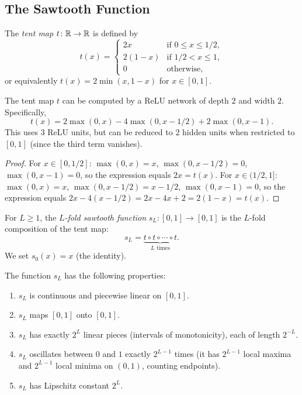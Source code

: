\documentclass[11pt,a4paper]{article}
\begin{document}
\subsection{The Sawtooth Function}
\label{sec:sawtooth}

\begin{definition}
\label{def:tent-map}
The \emph{tent map} $t \colon \mathbb{R} \to \mathbb{R}$ is defined by
\[
  t(x) = \begin{cases}
    2x & \text{if } 0 \le x \le 1/2, \\
    2(1-x) & \text{if } 1/2 < x \le 1, \\
    0 & \text{otherwise},
  \end{cases}
\]
or equivalently $t(x) = 2 \min(x, 1-x)$ for $x \in [0,1]$.
\end{definition}

\begin{lemma}
\label{lem:tent-relu}
The tent map $t$ can be computed by a ReLU network of depth $2$ and
width $2$.  Specifically,
\[
  t(x) = 2\max(0, x) - 4\max(0, x - 1/2) + 2\max(0, x - 1).
\]
This uses $3$ ReLU units, but can be reduced to $2$ hidden units when
restricted to $[0,1]$ (since the third term vanishes).
\end{lemma}

\begin{proof}
For $x \in [0, 1/2]$: $\max(0, x) = x$, $\max(0, x - 1/2) = 0$,
$\max(0, x - 1) = 0$, so the expression equals $2x = t(x)$.
For $x \in (1/2, 1]$: $\max(0, x) = x$, $\max(0, x - 1/2) = x - 1/2$,
$\max(0, x - 1) = 0$, so the expression equals
$2x - 4(x - 1/2) = 2x - 4x + 2 = 2(1-x) = t(x)$.
\end{proof}

\begin{definition}
\label{def:sawtooth}
For $L \ge 1$, the \emph{$L$-fold sawtooth function}
$s_L \colon [0,1] \to [0,1]$ is the $L$-fold composition of the
tent map:
\[
  s_L = \underbrace{t \circ t \circ \cdots \circ t}_{L \text{ times}}.
\]
We set $s_0(x) = x$ (the identity).
\end{definition}

\begin{lemma}
\label{lem:sawtooth-properties}
The function $s_L$ has the following properties:
\begin{enumerate}[nosep,label=(\roman*)]
  \item $s_L$ is continuous and piecewise linear on $[0,1]$.
  \item $s_L$ maps $[0,1]$ onto $[0,1]$.
  \item $s_L$ has exactly $2^L$ linear pieces (intervals of monotonicity),
    each of length $2^{-L}$.
  \item $s_L$ oscillates between $0$ and $1$ exactly $2^{L-1}$ times
    (it has $2^{L-1}$ local maxima and $2^{L-1}$ local minima on $(0,1)$,
    counting endpoints).
  \item $s_L$ has Lipschitz constant $2^L$.
\end{enumerate}
\end{lemma}
\end{document}
